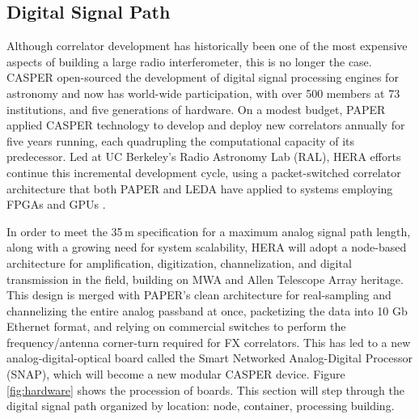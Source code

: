 \documentclass[preprint,11pt]{aastex}
\newcommand{\Mycitep}[1]{\citep{#1}}
\begin{document}
\subsection{Digital Signal Path}
\label{sec:digital}

\noindent Although correlator development has historically been one of the most 
expensive aspects of building a large radio interferometer, this is no longer the case.
CASPER \Mycitep{parsons_et_al2006}
open-sourced the development of digital signal processing engines for astronomy and
now has world-wide participation,
with over 500 members at 73 institutions, and 
five generations of hardware.
On a modest budget, PAPER applied CASPER technology to develop and deploy new correlators
annually for five years running, each quadrupling the computational capacity of its predecessor.
Led at UC Berkeley's Radio Astronomy Lab (RAL),
HERA efforts continue this incremental development cycle, using a packet-switched
correlator architecture \Mycitep{parsons_et_al2008} that both PAPER and LEDA have
applied to systems employing FPGAs and GPUs \citep{clark_et_al2011}.

In order to meet the 35\,m specification for a maximum analog signal path length, along with a growing need for system scalability, HERA will adopt a node-based architecture for amplification, digitization, channelization, and digital
transmission in the field, building on MWA and Allen Telescope Array heritage. This design is merged with PAPER's clean 
architecture for real-sampling and channelizing the entire analog passband at once, packetizing the data into
10 Gb Ethernet format, and relying on commercial switches to perform the frequency/antenna corner-turn required for FX correlators.  This has led to a new analog-digital-optical board called the Smart Networked Analog-Digital Processor (SNAP), which will become a new modular CASPER device.  Figure \ref{fig:hardware} shows the procession of boards.  This section will step through the digital signal path organized by location:  node, container, processing building.
\end{document}
